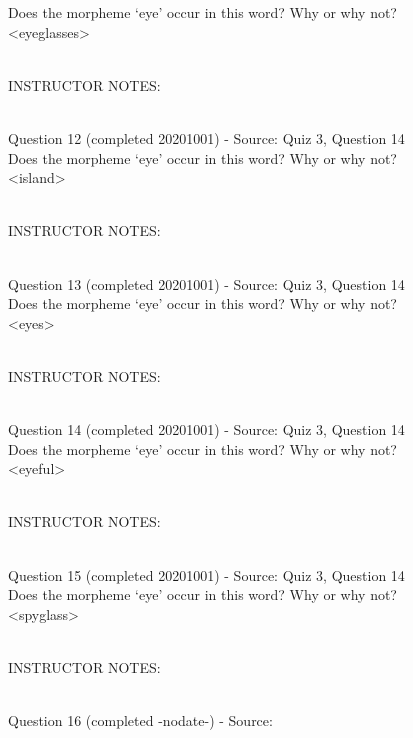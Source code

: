 \documentclass[12pt]{article}
\begin{document}
Does the morpheme ‘eye’ occur in this word? Why or why not?\\

<eyeglasses>


~\\
INSTRUCTOR NOTES: 


~\\

{\large Question 12} (completed 20201001) - Source: Quiz 3, Question 14\\

Does the morpheme ‘eye’ occur in this word? Why or why not?\\

<island>


~\\
INSTRUCTOR NOTES: 


~\\

{\large Question 13} (completed 20201001) - Source: Quiz 3, Question 14\\

Does the morpheme ‘eye’ occur in this word? Why or why not?\\

<eyes>


~\\
INSTRUCTOR NOTES: 


~\\

{\large Question 14} (completed 20201001) - Source: Quiz 3, Question 14\\

Does the morpheme ‘eye’ occur in this word? Why or why not?\\

<eyeful>


~\\
INSTRUCTOR NOTES: 


~\\

{\large Question 15} (completed 20201001) - Source: Quiz 3, Question 14\\

Does the morpheme ‘eye’ occur in this word? Why or why not?\\

<spyglass>


~\\
INSTRUCTOR NOTES: 


~\\

{\large Question 16} (completed -nodate-) - Source: \\
\end{document}
